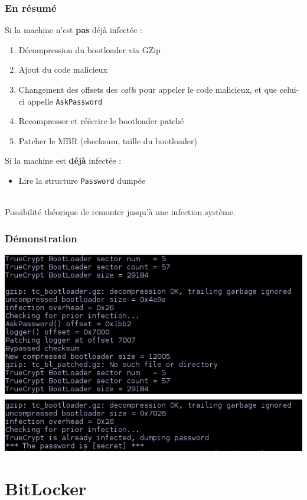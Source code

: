 \documentclass[red]{beamer}
\begin{document}
\begin{frame}
    \frametitle{En résumé}
    Si la machine n'est \textbf{pas} déjà infectée :
    \begin{enumerate}
        \item Décompression du bootloader via GZip
        \item Ajout du code malicieux
        \item Changement des offsets des \textit{call}s pour appeler
        le code malicieux, et que celui-ci appelle \texttt{AskPassword}
        \item Recompresser et réécrire le bootloader patché
        \item Patcher le MBR (checksum, taille du bootloader)
    \end{enumerate}
    Si la machine est \textbf{déjà} infectée :
    \begin{itemize}
        \item Lire la structure \texttt{Password} dumpée
    \end{itemize}
    ~\\
    
    Possibilité théorique de remonter jusqu'à une infection système.
\end{frame}

\begin{frame}
    \frametitle{Démonstration}
    \begin{center}
        \includegraphics[height=0.8\textheight]{img/demo_tc.png}
    \end{center}
\end{frame}

\section{BitLocker}
\end{document}
